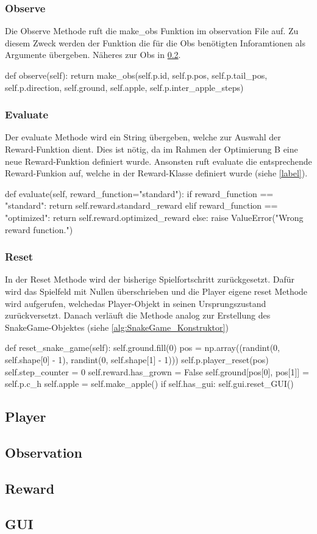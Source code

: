 \subsubsection{Observe}
Die Observe Methode ruft die make\_obs Funktion im observation File auf. Zu diesem Zweck werden der Funktion die für die Obs benötigten Inforamtionen als Argumente übergeben. Näheres zur Obs in \ref{sec:Implementierung_Observation}.
\begin{python}
    def observe(self):
			return make_obs(self.p.id, self.p.pos, self.p.tail_pos, self.p.direction, self.ground, self.apple, self.p.inter_apple_steps)
\end{python}

\subsubsection{Evaluate}
Der evaluate Methode wird ein String übergeben, welche zur Auswahl der Reward-Funktion dient. Dies ist nötig, da im Rahmen der Optimierung B eine neue Reward-Funktion definiert wurde. Ansonsten ruft evaluate die entsprechende Reward-Funkion auf, welche in der Reward-Klasse definiert wurde (siehe \ref{label}).
\begin{python}
	def evaluate(self, reward_function="standard"):
		if reward_function == "standard":
			return self.reward.standard_reward
		elif reward_function == "optimized":
			return self.reward.optimized_reward
		else:
			raise ValueError("Wrong reward function.")
\end{python}

\subsubsection{Reset}
In der Reset Methode wird der bisherige Spielfortschritt zurückgesetzt. Dafür wird das Spielfeld mit Nullen überschrieben und die Player eigene reset Methode wird aufgerufen, welchedas Player-Objekt in seinen Ursprungszustand zurückversetzt. Danach verläuft die Methode analog zur Erstellung des SnakeGame-Objektes (siehe \ref{alg:SnakeGame_Konstruktor})
\begin{python}
	def reset_snake_game(self):
		self.ground.fill(0)
		pos = np.array((randint(0, self.shape[0] - 1), randint(0, self.shape[1] - 1)))
		self.p.player_reset(pos)
		self.step_counter = 0
		self.reward.has_grown = False
		self.ground[pos[0], pos[1]] = self.p.c_h
		self.apple = self.make_apple()
		if self.has_gui:
			self.gui.reset_GUI()
\end{python}

\subsection{Player} \label{sec:Implementierung_Player}

\subsection{Observation} \label{sec:Implementierung_Observation}

\subsection{Reward} \label{sec:Implementierung_Reward}

\subsection{GUI} \label{sec:Implementierung_GUI}